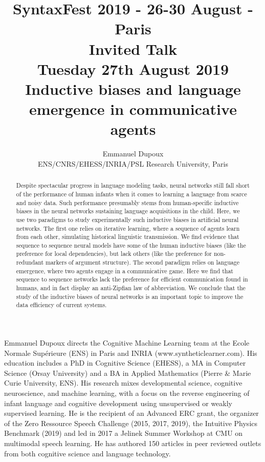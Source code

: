 \documentclass[11pt]{article}
\title{{\footnotesize SyntaxFest 2019 - 26-30 August - Paris}\\
\vspace{10mm}
 Invited Talk\\
  {\small Tuesday 27th August 2019}\\
  Inductive biases and language emergence in communicative agents}
\author{Emmanuel Dupoux\\
  ENS/CNRS/EHESS/INRIA/PSL Research University, Paris}
\begin{document}
\maketitle
\begin{abstract}
  Despite spectacular progress in language modeling tasks, neural networks still fall short of the performance of human infants when it comes to learning a language from scarce and noisy data. Such performance presumably stems from human-specific inductive biases in the neural networks sustaining language acquisitions in the child. Here, we use two paradigms to study experimentally such inductive biases in artificial neural networks. The first one relies on iterative learning, where a sequence of agents learn from each other, simulating historical linguistic transmission. We find evidence that sequence to sequence neural models have some of the human inductive biases (like the preference for local dependencies), but lack others (like the preference for non-redundant markers of argument structure). The second paradigm relies on language emergence, where two agents engage in a communicative game. Here we find that sequence to sequence networks lack the preference for efficient communication found in humans, and in fact display an anti-Zipfian law of abbreviation. We conclude that the study of the inductive biases of neural networks is an important topic to improve the data efficiency of current systems.
\end{abstract}

\vspace{4mm}
\begin{shortbio}
Emmanuel Dupoux directs the Cognitive Machine Learning team at the Ecole Normale Supérieure (ENS) in Paris and INRIA (www.syntheticlearner.com).  His education includes a PhD in Cognitive Science (EHESS), a MA in Computer Science (Orsay University) and a BA in Applied Mathematics (Pierre \& Marie Curie University, ENS). His research mixes developmental science, cognitive neuroscience, and machine learning, with a focus on the reverse engineering of infant language and cognitive development using unsupervised or weakly supervised learning. He is the recipient of an Advanced ERC grant, the organizer of the Zero Ressource Speech Challenge (2015, 2017, 2019), the Intuitive Physics Benchmark (2019) and led in 2017 a Jelinek Summer Workshop at CMU on multimodal speech learning. He has authored 150 articles in peer reviewed outlets from both cognitive science and language technology.
\end{shortbio}
\end{document}
